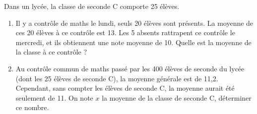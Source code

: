 \documentclass[a4paper,11pt,DIV15,BCOR0mm]{scrartcl}
\begin{document}
\begin{exercice}
 Dans un lycée, la  classe de seconde C comporte 25 élèves. 
\begin{enumerate}
 \item Il y a contrôle de maths le lundi, seuls 20 élèves sont présents.
La moyenne de ces 20 élèves à ce contrôle est 13. Les 5 absents rattrapent ce contrôle le mercredi, et ils obtiennent
une note moyenne de 10. Quelle est la moyenne de la classe à ce contrôle ?
 \item Au contrôle commun de maths passé par les 400 élèves de seconde du lycée (dont les 25 élèves de seconde C), la moyenne générale est de 11,2.
Cependant, sans compter les élèves de seconde C, la moyenne aurait été seulement de 11. On note $x$ la moyenne de la classe de seconde C,
déterminer ce nombre.
\end{enumerate}
\end{exercice}
\end{document}
